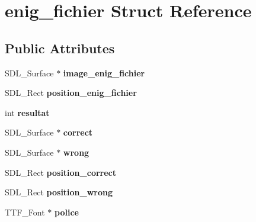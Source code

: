 \hypertarget{structenig__fichier}{}\section{enig\+\_\+fichier Struct Reference}
\label{structenig__fichier}
\subsection*{Public Attributes}
\begin{DoxyCompactItemize}
\item 
S\+D\+L\+\_\+\+Surface $\ast$ {\bfseries image\+\_\+enig\+\_\+fichier}\hypertarget{structenig__fichier_af80832295041f4cefbcd56a982581177}{}\label{structenig__fichier_af80832295041f4cefbcd56a982581177}

\item 
S\+D\+L\+\_\+\+Rect {\bfseries position\+\_\+enig\+\_\+fichier}\hypertarget{structenig__fichier_a189b9c512c7927d622074abc80ff0142}{}\label{structenig__fichier_a189b9c512c7927d622074abc80ff0142}

\item 
int {\bfseries resultat}\hypertarget{structenig__fichier_a04cce597fc477d6f905a7b411fc64f6c}{}\label{structenig__fichier_a04cce597fc477d6f905a7b411fc64f6c}

\item 
S\+D\+L\+\_\+\+Surface $\ast$ {\bfseries correct}\hypertarget{structenig__fichier_ab5982d9a2708b616ca88beaab12f1bd4}{}\label{structenig__fichier_ab5982d9a2708b616ca88beaab12f1bd4}

\item 
S\+D\+L\+\_\+\+Surface $\ast$ {\bfseries wrong}\hypertarget{structenig__fichier_a3d6bc1ccd58fedc5c6c75969150336f7}{}\label{structenig__fichier_a3d6bc1ccd58fedc5c6c75969150336f7}

\item 
S\+D\+L\+\_\+\+Rect {\bfseries position\+\_\+correct}\hypertarget{structenig__fichier_a9aa202965581a8a4ab84a55c352a2eca}{}\label{structenig__fichier_a9aa202965581a8a4ab84a55c352a2eca}

\item 
S\+D\+L\+\_\+\+Rect {\bfseries position\+\_\+wrong}\hypertarget{structenig__fichier_ad93b1626bba919f9bba4ba3959425b53}{}\label{structenig__fichier_ad93b1626bba919f9bba4ba3959425b53}

\item 
T\+T\+F\+\_\+\+Font $\ast$ {\bfseries police}\hypertarget{structenig__fichier_aaf6ec3f1943b018371d6b04335aee47a}{}\label{structenig__fichier_aaf6ec3f1943b018371d6b04335aee47a}


\end{DoxyCompactItemize}
